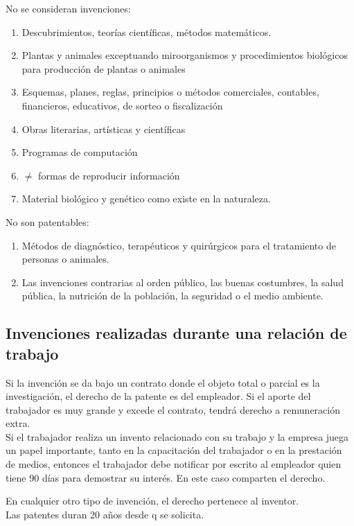 \documentclass[spanish,12pt,a4paper,titlepage]{report}
\begin{document}
No se consideran invenciones:
\begin{enumerate}
	\item Descubrimientos, teorías científicas, métodos matemáticos.
	\item Plantas y animales exceptuando miroorganismos y procedimientos biológicos para producción de plantas o animales
	\item Esquemas, planes, reglas, principios o métodos comerciales, contables, financieros, educativos, de sorteo o fiscalización
	\item Obras literarias, artísticas y científicas
	\item Programas de computación
	\item $\neq$ formas de reproducir información
	\item Material biológico y genético como existe en la naturaleza.\\
\end{enumerate}
No son patentables:
\begin{enumerate}
	\item Métodos de diagnóstico, terapéuticos y quirúrgicos para el tratamiento de personas o animales.
	\item Las invenciones contrarias al orden público, las buenas costumbres, la salud pública, la nutrición de la población, la seguridad o el medio ambiente.
\end{enumerate}

\subsection{Invenciones realizadas durante una relación de trabajo}
Si la invención se da bajo un contrato donde el objeto total o parcial es la investigación, el derecho de la patente es del empleador. Si el aporte del trabajador es muy grande y excede el contrato, tendrá derecho a remuneración extra.\\

Si el trabajador realiza un invento relacionado con su trabajo y la empresa juega un papel importante, tanto en la capacitación del trabajador o en la prestación de medios, entonces el trabajador debe notificar por escrito al empleador quien tiene 90 días para demostrar su interés. En este caso comparten el derecho.

En cualquier otro tipo de invención, el derecho pertenece al inventor.\\

Las patentes duran 20 años desde q se solicita.
\end{document}
